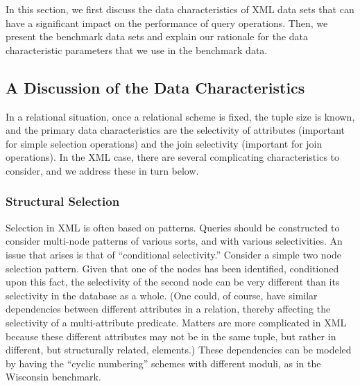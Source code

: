In this section, we first discuss the data characteristics of XML data
sets that can have a significant impact on the performance of query
operations. Then, we present the benchmark data sets and explain our
rationale for the data characteristic parameters that we use in the
benchmark data. 

\subsection{A Discussion of the Data Characteristics}
\label{sec:data-char}

In a relational situation, once a relational scheme is fixed, the
tuple size is known, and the primary data characteristics are the
selectivity of attributes (important for simple selection operations)
and the join selectivity (important for join operations). In the XML
case, there are several complicating characteristics to consider, and
we address these in turn below.


\subsubsection{Structural Selection}
Selection in XML is often based on patterns.  Queries should be
constructed to consider multi-node patterns of various sorts, and with
various selectivities.  An issue that arises is that of ``conditional
selectivity.'' Consider a simple two node selection pattern. Given
that one of the nodes has been identified, conditioned upon this fact,
the selectivity of the second node can be very different than its
selectivity in the database as a whole.  (One could, of course, have
similar dependencies between different attributes in a relation,
thereby affecting the selectivity of a multi-attribute predicate.
Matters are more complicated in XML because these different attributes
may not be in the same tuple, but rather in different, but
structurally related, elements.)  These dependencies can be modeled
by having the ``cyclic numbering'' schemes with different moduli, as
in the Wisconsin benchmark.

